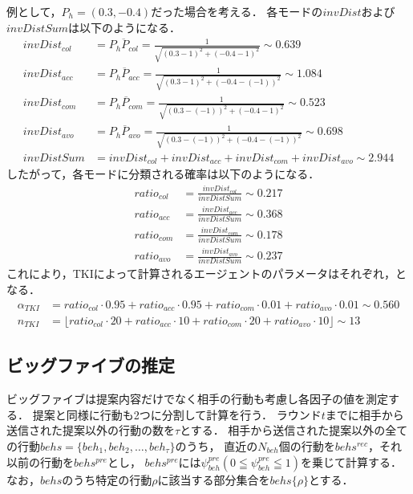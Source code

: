 例として，$P_h = (0.3, -0.4)$だった場合を考える．
各モードの$invDist$および$invDistSum$は以下のようになる．
\begin{align}
    invDist_{col} &= \overline{P_h P_{col}} = \frac{1}{\sqrt{(0.3 - 1)^2 + (-0.4 - 1)^2}} \sim 0.639 \nonumber\\
    invDist_{acc} &= \overline{P_h P_{acc}} = \frac{1}{\sqrt{(0.3 - 1)^2 + (-0.4 - (-1))^2}} \sim 1.084 \nonumber\\
    invDist_{com} &= \overline{P_h P_{com}} = \frac{1}{\sqrt{(0.3 - (-1))^2 + (-0.4 - 1)^2}} \sim 0.523 \nonumber\\
    invDist_{avo} &= \overline{P_h P_{avo}} = \frac{1}{\sqrt{(0.3 - (-1))^2 + (-0.4 - (-1))^2}} \sim 0.698 \nonumber\\
    invDistSum &= invDist_{col} + invDist_{acc} + invDist_{com} + invDist_{avo} \sim 2.944 \nonumber
\end{align}
したがって，各モードに分類される確率は以下のようになる．
\begin{align}
    ratio_{col} &= \frac{invDist_{col}}{invDistSum} \sim 0.217 \nonumber\\
    ratio_{acc} &= \frac{invDist_{acc}}{invDistSum} \sim 0.368 \nonumber\\
    ratio_{com} &= \frac{invDist_{com}}{invDistSum} \sim 0.178 \nonumber\\
    ratio_{avo} &= \frac{invDist_{avo}}{invDistSum} \sim 0.237 \nonumber
\end{align}
これにより，TKIによって計算されるエージェントのパラメータはそれぞれ，となる．
\begin{align}
    \alpha_{TKI} &= ratio_{col} \cdot 0.95 + ratio_{acc} \cdot 0.95 + ratio_{com} \cdot 0.01 + ratio_{avo} \cdot 0.01 \sim 0.560 \label{eq:tki-alpha} \\
    n_{TKI} &= \lfloor ratio_{col} \cdot 20 + ratio_{acc} \cdot 10 + ratio_{com} \cdot 20 + ratio_{avo} \cdot 10 \rfloor \sim 13 \label{eq:tki-n}
\end{align}

\subsection{ビッグファイブの推定}
ビッグファイブは提案内容だけでなく相手の行動も考慮し各因子の値を測定する．
提案と同様に行動も2つに分割して計算を行う．
ラウンド$t$までに相手から送信された提案以外の行動の数を$\tau$とする．
相手から送信された提案以外の全ての行動$behs = \{ beh_1, beh_2, \ldots , beh_\tau \}$のうち，
直近の$N_{beh}$個の行動を$behs^{rec}$，それ以前の行動を$behs^{pre}$とし，
$behs^{pre}$には$\psi_{beh}^{pre}(0 \leqq \psi_{beh}^{pre} \leqq 1)$を乗じて計算する．
なお，$behs$のうち特定の行動$\rho$に該当する部分集合を$behs\{\rho\}$とする．


